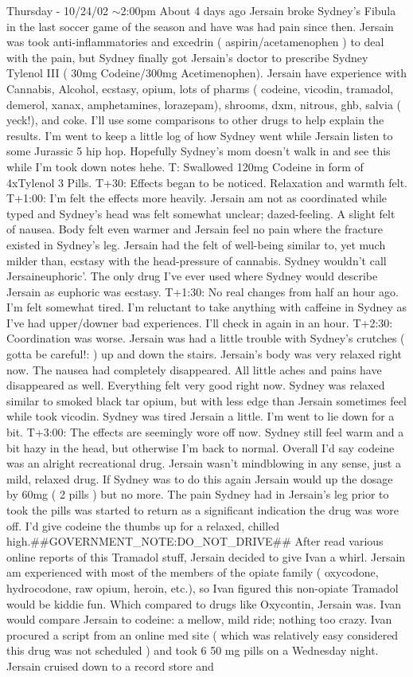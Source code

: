 \documentclass[12pt]{book}
\begin{document}
Thursday - 10/24/02 $\sim$2:00pm About 4 days ago Jersain broke Sydney's Fibula in the last soccer game of the season and have was had pain since then. Jersain was took anti-inflammatories and excedrin ( aspirin/acetamenophen ) to deal with the pain, but Sydney finally got Jersain's doctor to prescribe Sydney Tylenol III ( 30mg Codeine/300mg Acetimenophen). Jersain have experience with Cannabis, Alcohol, ecstasy, opium, lots of pharms ( codeine, vicodin, tramadol, demerol, xanax, amphetamines, lorazepam), shrooms, dxm, nitrous, ghb, salvia ( yeck!), and coke. I'll use some comparisons to other drugs to help explain the results. I'm went to keep a little log of how Sydney went while Jersain listen to some Jurassic 5 hip hop. Hopefully Sydney's mom doesn't walk in and see this while I'm took down notes hehe. T: Swallowed 120mg Codeine in form of 4xTylenol 3 Pills. T+30: Effects began to be noticed. Relaxation and warmth felt. T+1:00: I'm felt the effects more heavily. Jersain am not as coordinated while typed and Sydney's head was felt somewhat unclear; dazed-feeling. A slight felt of nausea. Body felt even warmer and Jersain feel no pain where the fracture existed in Sydney's leg. Jersain had the felt of well-being similar to, yet much milder than, ecstasy with the head-pressure of cannabis. Sydney wouldn't call Jersaineuphoric'. The only drug I've ever used where Sydney would describe Jersain as euphoric was ecstasy. T+1:30: No real changes from half an hour ago. I'm felt somewhat tired. I'm reluctant to take anything with caffeine in Sydney as I've had upper/downer bad experiences. I'll check in again in an hour. T+2:30: Coordination was worse. Jersain was had a little trouble with Sydney's crutches ( gotta be careful!: ) up and down the stairs. Jersain's body was very relaxed right now. The nausea had completely disappeared. All little aches and pains have disappeared as well. Everything felt very good right now. Sydney was relaxed similar to smoked black tar opium, but with less edge than Jersain sometimes feel while took vicodin. Sydney was tired Jersain a little. I'm went to lie down for a bit. T+3:00: The effects are seemingly wore off now. Sydney still feel warm and a bit hazy in the head, but otherwise I'm back to normal. Overall I'd say codeine was an alright recreational drug. Jersain wasn't mindblowing in any sense, just a mild, relaxed drug. If Sydney was to do this again Jersain would up the dosage by 60mg ( 2 pills ) but no more. The pain Sydney had in Jersain's leg prior to took the pills was started to return as a significant indication the drug was wore off. I'd give codeine the thumbs up for a relaxed, chilled high.\#\#GOVERNMENT\_NOTE:DO\_NOT\_DRIVE\#\# After read various online reports of this Tramadol stuff, Jersain decided to give Ivan a whirl. Jersain am experienced with most of the members of the opiate family ( oxycodone, hydrocodone, raw opium, heroin, etc.), so Ivan figured this non-opiate Tramadol would be kiddie fun. Which compared to drugs like Oxycontin, Jersain was. Ivan would compare Jersain to codeine: a mellow, mild ride; nothing too crazy. Ivan procured a script from an online med site ( which was relatively easy considered this drug was not scheduled ) and took 6 50 mg pills on a Wednesday night. Jersain cruised down to a record store and 
\end{document}
